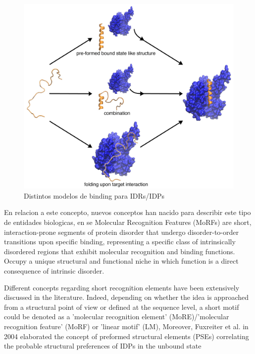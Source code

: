 \begin{figure}[h!,centered]
\includegraphics[width=\textwidth]{img/PSE-MoRE.jpg} 
\caption{Distintos modelos de binding para IDRs/IDPs} \label{idpBinding}
\end{figure}






En relacion a este concepto, nuevos conceptos han nacido para describir este tipo de entidades biologicas, en \cite{oldfield2005coupled} se 
Molecular Recognition Features (MoRFs) are short, interaction-prone segments of protein disorder that undergo disorder-to-order transitions upon specific binding, 
representing a specific class of intrinsically disordered regions that exhibit molecular recognition and binding functions.
Occupy a unique structural and functional niche in which function is a direct consequence of intrinsic disorder.

Different concepts regarding short recognition elements have been extensively discussed in the literature. Indeed, depending on whether the idea is approached from a structural point of view
or defined at the sequence level, a short motif could be denoted as a 'molecular recognition element' (MoRE)/'molecular recognition feature' (MoRF) or 'linear motif' (LM),
Moreover, Fuxreiter et al. in 2004 elaborated the concept of
preformed structural elements (PSEs) correlating the probable
structural preferences of IDPs in the unbound state

